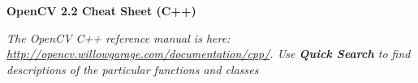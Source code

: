 \documentclass[10pt,landscape]{article}
\makeatletter
\renewcommand{\section}{\@startsection{section}{1}{0mm}%
                                {-1ex plus -.5ex minus -.2ex}%
                                {0.5ex plus .2ex}%
                                {\normalfont\large\bfseries}}
\makeatother
\begin{document}
\raggedright
\footnotesize
\begin{multicols}{3}


\setlength{\premulticols}{1pt}
\setlength{\postmulticols}{1pt}
\setlength{\multicolsep}{1pt}
\setlength{\columnsep}{2pt}

\begin{center}
     \Large{\textbf{OpenCV 2.2 Cheat Sheet (C++)}} \\
\end{center}
\newlength{\MyLen}


\emph{The OpenCV C++ reference manual is here: \url{http://opencv.willowgarage.com/documentation/cpp/}. Use \textbf{Quick Search} to find descriptions of the particular functions and classes}


\end{multicols}
\end{document}
